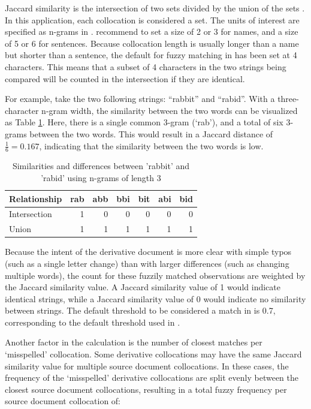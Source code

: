 Jaccard similarity is the intersection of two sets divided by the union of the sets \citep{wu_review_2022}.
In this application, each collocation is considered a set.
The units of interest are specified as n-grams in .
\citet{zoomerjoin} recommend to set a size of 2 or 3 for names, and a size of 5 or 6 for sentences.
Because collocation length is usually longer than a name but shorter than a sentence, the default for fuzzy matching in  has been set at 4 characters.
This means that a subset of 4 characters in the two strings being compared will be counted in the intersection if they are identical.

For example, take the two following strings: ``rabbit'' and ``rabid''.
With a three-character n-gram width, the similarity between the two words can be visualized as Table \ref{tab:jaccard-example}.
Here, there is a single common 3-gram (`rab'), and a total of six 3-grams between the two words.
This would result in a Jaccard distance of \(\frac{1}{6}=0.167\), indicating that the similarity between the two words is low.

\begin{table}[t]
\caption{\label{tab:jaccard-example}Similarities and differences between 'rabbit' and 'rabid' using n-grams of length 3} 
\fontsize{9.0pt}{11.0pt}\selectfont
\begin{tabular*}{\linewidth}{@{\extracolsep{\fill}}lrrrrrr}
\toprule
Relationship & rab & abb & bbi & bit & abi & bid \\ 
\midrule\addlinespace[2.5pt]
Intersection & 1 & 0 & 0 & 0 & 0 & 0 \\ 
Union & 1 & 1 & 1 & 1 & 1 & 1 \\ 
\bottomrule
\end{tabular*}
\end{table}

Because the intent of the derivative document is more clear with simple typos (such as a single letter change) than with larger differences (such as changing multiple words), the count for these fuzzily matched observations are weighted by the Jaccard similarity value.
A Jaccard similarity value of 1 would indicate identical strings, while a Jaccard similarity value of 0 would indicate no similarity between strings.
The default threshold to be considered a match in  is 0.7, corresponding to the default threshold used in  \citep{zoomerjoin}.

Another factor in the calculation is the number of closest matches per `misspelled' collocation.
Some derivative collocations may have the same Jaccard similarity value for multiple source document collocations.
In these cases, the frequency of the `misspelled' derivative collocations are split evenly between the closest source document collocations, resulting in a total fuzzy frequency per source document collocation of:

